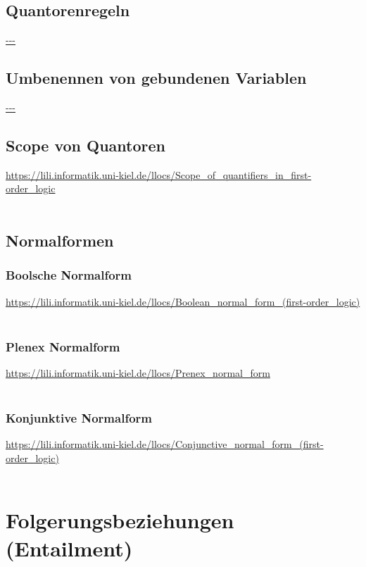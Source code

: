 \documentclass[twocolumn]{article}
\begin{document}
    \subsection{Quantorenregeln}
    \url{---}\\

    \subsection{Umbenennen von gebundenen Variablen}
    \url{---}\\

    \subsection{Scope von Quantoren}
    \url{https://lili.informatik.uni-kiel.de/llocs/Scope_of_quantifiers_in_first-order_logic}\\\\

    \subsection{Normalformen}

    \subsubsection{Boolsche Normalform}
    \url{https://lili.informatik.uni-kiel.de/llocs/Boolean_normal_form_(first-order_logic)}\\\\

    \subsubsection{Plenex Normalform}
    \url{https://lili.informatik.uni-kiel.de/llocs/Prenex_normal_form}\\\\

    \subsubsection{Konjunktive Normalform}
    \url{https://lili.informatik.uni-kiel.de/llocs/Conjunctive_normal_form_(first-order_logic)}\\\\

    \section{Folgerungsbeziehungen (Entailment)}
\end{document}
